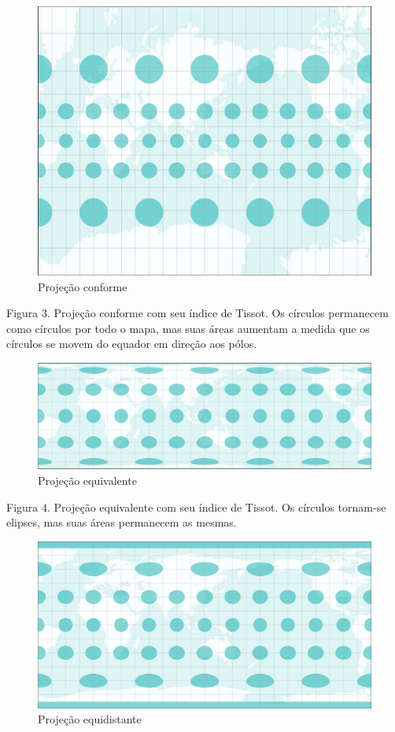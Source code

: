 \documentclass[
]{book}
\begin{document}
\begin{figure}
\centering
\includegraphics{media/modulo0/conformal.png}
\caption{Projeção conforme}
\end{figure}

Figura 3. Projeção conforme com seu índice de Tissot. Os círculos permanecem como círculos por todo o mapa, mas suas áreas aumentam a medida que os círculos se movem do equador em direção aos pólos.

\begin{figure}
\centering
\includegraphics{media/modulo0/authalic.png}
\caption{Projeção equivalente}
\end{figure}

Figura 4. Projeção equivalente com seu índice de Tissot. Os círculos tornam-se elipses, mas suas áreas permanecem as mesmas.

\begin{figure}
\centering
\includegraphics{media/modulo0/equidistant.png}
\caption{Projeção equidistante}
\end{figure}
\end{document}
